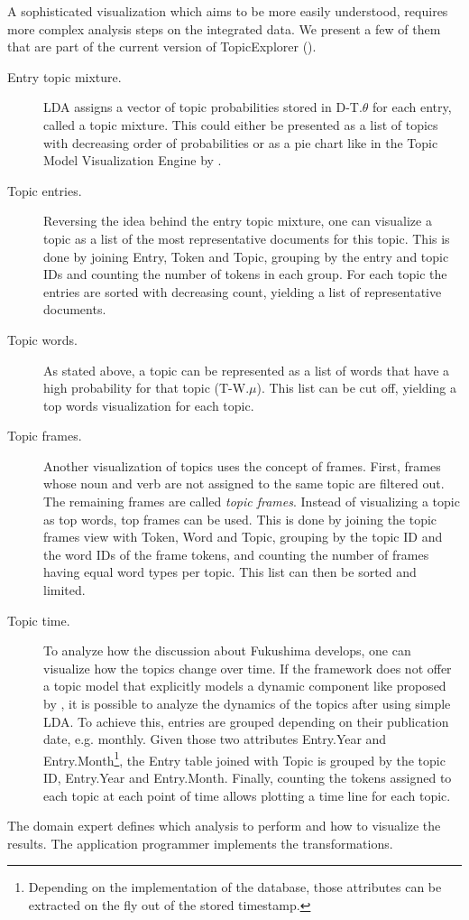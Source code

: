 A sophisticated visualization which aims to be more easily understood, requires more complex analysis steps on the integrated data. We present a few of them that are part of the current version of TopicExplorer (\cite{hinneburg2014topic}).

\begin{description}
\item[Entry topic mixture.] LDA assigns a vector of topic probabilities stored in D-T.$\theta$ for each entry, called a topic mixture. This could either be presented as a list of topics with decreasing order of probabilities or as a pie chart like in the Topic Model Visualization Engine by \textcite{chaney2012visualizing}.

\item[Topic entries.] Reversing the idea behind the entry topic mixture, one can visualize a topic as a list of the most representative documents for this topic. This is done by joining Entry, Token and Topic, grouping by the entry and topic IDs and counting the number of tokens in each group. For each topic the entries are sorted with decreasing count, yielding a list of representative documents.

\item[Topic words.] As stated above, a topic can be represented as a list of words that have a high probability for that topic (T-W.$\mu$). This list can be cut off, yielding a top words visualization for each topic.

\item[Topic frames.] Another visualization of topics uses the concept of frames. First, frames whose noun and verb are not assigned to the same topic are filtered out. The remaining frames are called \emph{topic frames}. Instead of visualizing a topic as top words, top frames can be used. This is done by joining the topic frames view with Token, Word and Topic, grouping by the topic ID and the word IDs of the frame tokens, and counting the number of frames having equal word types per topic. This list can then be sorted and limited.

\item[Topic time.] To analyze how the discussion about Fukushima develops, one can visualize how the topics change over time. If the framework does not offer a topic model that explicitly models a dynamic component like proposed by \textcite{blei2006dynamic}, it is possible to analyze the dynamics of the topics after using simple LDA. To achieve this, entries are grouped depending on their publication date, e.g. monthly. Given those two attributes Entry.Year and Entry.Month\footnote{Depending on the implementation of the database, those attributes can be extracted on the fly out of the stored timestamp.}, the Entry table joined with Topic is grouped by the topic ID, Entry.Year and Entry.Month. Finally, counting the tokens assigned to each topic at each point of time allows plotting a time line for each topic.
\end{description}

The domain expert defines which analysis to perform and how to visualize the results. The application programmer implements the transformations.
